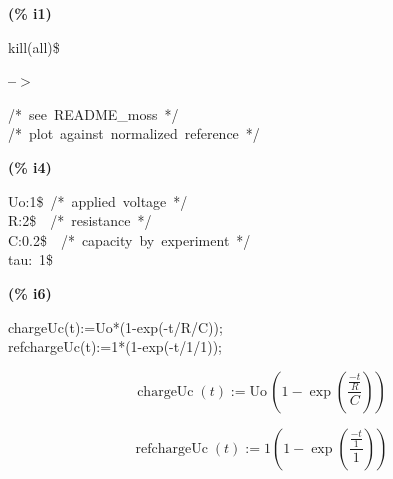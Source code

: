 \documentclass[fleqn]{article}
\begin{document}
\noindent
\begin{minipage}[t]{4.000000em}\color{red}\bfseries
(\% i1)	
\end{minipage}
\begin{minipage}[t]{\textwidth}\color{blue}
kill(all)\$
\end{minipage}

\noindent%



\noindent
\begin{minipage}[t]{4.000000em}\color{red}\bfseries
 --\ensuremath{\ensuremath{>}}	
\end{minipage}
\begin{minipage}[t]{\textwidth}\color{blue}
/*\ see\ README\_moss\ */\\
/*\ plot\ against\ normalized\ reference\ */
\end{minipage}

\noindent%



\noindent
\begin{minipage}[t]{4.000000em}\color{red}\bfseries
(\% i4)	
\end{minipage}
\begin{minipage}[t]{\textwidth}\color{blue}
Uo:1\$\ /*\ applied\ voltage\ */\\
R:2\$\ \ /*\ resistance\ */\\
C:0.2\$\ \ /*\ capacity\ by\ experiment\ */\\
tau:\ 1\$
\end{minipage}

\noindent%



\noindent
\begin{minipage}[t]{4.000000em}\color{red}\bfseries
(\% i6)	
\end{minipage}
\begin{minipage}[t]{\textwidth}\color{blue}
chargeUc(t):=Uo*(1-exp(-t/R/C));\\
refchargeUc(t):=1*(1-exp(-t/1/1));
\end{minipage}
\[\displaystyle \tag{\% o5} 
\mathop{chargeUc}(t)\mathop{:=}\ensuremath{\mathrm{Uo}}\, \left( 1\mathop{-}\mathop{exp}\left( \frac{\frac{\mathop{-}t}{R}}{C}\right) \right) \mbox{}\]

\[\tag{\% o6} 
\mathop{refchargeUc}(t)\mathop{:=}1 \left( 1\mathop{-}\mathop{exp}\left( \frac{\frac{\mathop{-}t}{1}}{1}\right) \right) \mbox{}
\]
\end{document}
